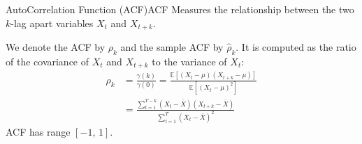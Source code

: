 \begin{definition}{AutoCorrelation Function (ACF)}{ACF}
	Measures the relationship between the two $k$-lag apart variables
	$X_t$ and $X_{t+k}$.

	We denote the ACF by $\rho_k$ and the sample ACF by $\hat{\rho}_k$. It is computed
	as the ratio of the covariance of $X_t$ and $X_{t+k}$ to the variance of $X_t$:
	\begin{align*}
		\rho_k & = \frac{\gamma(k)}{\gamma(0)} = \frac{\mathbb{E}\left[(X_t - \mu)(X_{t+k} - \mu)\right]}{\mathbb{E}\left[(X_t - \mu)^2\right]} \\
		       & = \frac{\sum_{t=1}^{T-k} (X_t - \bar{X})(X_{t+k} - \bar{X})}{\sum_{t=1}^T (X_t - \bar{X})^2}
               \tag{ACF}\label{eq:acf}
	\end{align*}
    \tcblower
    ACF has range $[-1,\,1]$.
\end{definition}

